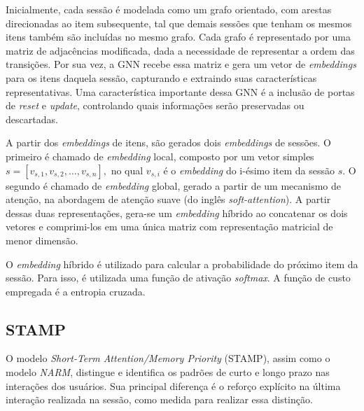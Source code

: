 Inicialmente, cada sessão é modelada como um grafo orientado, com arestas
direcionadas ao item subsequente, tal que demais sessões que tenham os mesmos
itens também são incluídas no mesmo grafo. Cada grafo é representado por uma
matriz de adjacências modificada, dada a necessidade de representar a ordem das
transições. Por sua vez, a GNN recebe essa matriz e gera um vetor de
\textit{embeddings} para os itens daquela sessão, capturando e extraindo suas
características representativas. Uma característica importante dessa GNN é a inclusão
de portas de \textit{reset} e \textit{update}, controlando quais informações
serão preservadas ou descartadas.

A partir dos \textit{embeddings} de itens, são gerados dois \textit{embeddings}
de sessões. O primeiro é chamado de \textit{embedding} local, composto por um
vetor simples $s = [v_{s,1}, v_{s,2}, \ldots, v_{s,n}],$ no qual $v_{s,i}$ é o
\textit{embedding} do i-ésimo item da sessão $s$. O segundo é chamado de
\textit{embedding} global, gerado a partir de um mecanismo de atenção, na
abordagem de atenção suave (do inglês \textit{soft-attention}). A partir dessas
duas representações, gera-se um \textit{embedding} híbrido ao concatenar os dois
vetores e comprimi-los em uma única matriz com representação matricial de menor
dimensão.

O \textit{embedding} híbrido é utilizado para calcular a probabilidade do próximo item
da sessão. Para isso, é utilizada uma função de ativação \textit{softmax}. A função de custo
empregada é a entropia cruzada.

\subsection{STAMP}
O modelo \textit{Short-Term Attention/Memory Priority} (STAMP), assim como o
modelo \textit{NARM}, distingue e identifica os padrões de curto e longo prazo
nas interações dos usuários. Sua principal diferença é o reforço explícito na
última interação realizada na sessão, como medida para realizar essa distinção.

